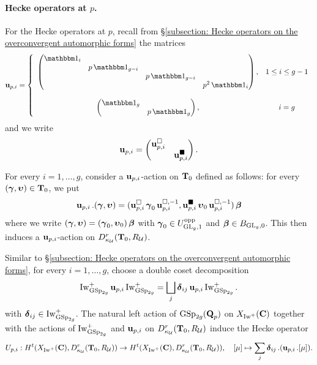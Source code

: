\paragraph{Hecke operators at $p$.} For the Hecke operators at $p$, recall from \S \ref{subsection: Hecke operators on the overconvergent automorphic forms} the matrices \begin{align*}
    \bfu_{p,i} = \left\{\begin{array}{cc}
        \begin{pmatrix} \one_i \\ & p\one_{g-i}\\ & & p\one_{g-i}\\ & & & p^2\one_i\end{pmatrix}, & 1\leq i \leq g-1 \\
        \\
        \begin{pmatrix}\one_g\\ & p\one_g\end{pmatrix}, & i=g
    \end{array}\right.
\end{align*} and we write \[
    \bfu_{p,i} = \begin{pmatrix}\bfu_{p,i}^{\square} & \\ & \bfu_{p,i}^{\blacksquare}\end{pmatrix}.
\] 

For every $i=1, \ldots, g$, consider a $\bfu_{p,i}$-action on $\T_0$ defined as follows: for every $(\bfgamma, \bfupsilon)\in \T_0$, we put
\[
\bfu_{p,i} . (\bfgamma, \bfupsilon) = (\bfu_{p,i}^{\square} \bfgamma_0 \bfu_{p,i}^{\square, -1}, \bfu_{p,i}^{\blacksquare} \bfupsilon_0 \bfu_{p,i}^{\square, -1})\bfbeta
\]
where we write $(\bfgamma, \bfupsilon) = (\bfgamma_0, \bfupsilon_0)\bfbeta$ with $\bfgamma_0\in U_{\GL_g, 1}^{\opp}$ and $\bfbeta\in B_{\GL_g, 0}$. This then induces a $\bfu_{p,i}$-action on $D_{\kappa_{\calU}}^{r}(\T_0, R_{\calU})$.

Similar to \S \ref{subsection: Hecke operators on the overconvergent automorphic forms}, for every $i=1, \ldots, g$, choose a double coset decomposition \[
    \Iw_{\GSp_{2g}}^+ \bfu_{p,i} \Iw_{\GSp_{2g}}^+ = \bigsqcup_{j}\bfdelta_{ij}\bfu_{p,i}\Iw_{\GSp_{2g}}^+.
\]
with $\bfdelta_{ij}\in \Iw_{\GSp_{2g}}^+$. The natural left action of $\GSp_{2g}(\Q_p)$ on $X_{\Iw^+}(\C)$ together with the actions of $\Iw_{\GSp_{2g}}^+$ and $\bfu_{p,i}$ on $D_{\kappa_{\calU}}^r(\T_0, R_{\calU})$ induce the Hecke operator \begin{equation}\label{eq: Hecek on coh. at p}
    U_{p,i}: H^t(X_{\Iw^+}(\C), D_{\kappa_{\calU}}^r(\T_0, R_{\calU})) \rightarrow H^t(X_{\Iw^+}(\C), D_{\kappa_{\calU}}^r(\T_0, R_{\calU})), \quad [\mu]\mapsto \sum_{j} \bfdelta_{ij} . (\bfu_{p,i} . [\mu]).
\end{equation}

